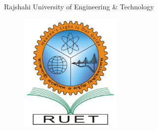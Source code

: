 \documentclass[12pt]{article}
\begin{document}
\begin{center}
    Rajshahi University of Engineering \& Technology
\end{center}
\begin{figure}[h!]
    \centering
    \includegraphics[width=5cm]{figs/RUET.png}
    \label{fig:ruet}
\end{figure}

\tableofcontents






\end{document}
